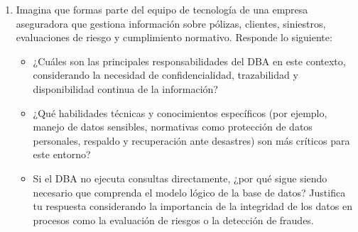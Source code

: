 \documentclass[12pt]{report}
\begin{document}
\begin{enumerate}[label=\textbf{\arabic*.}, leftmargin=*]
\begin{enumerate}[label=\textbf{\alph*.}, leftmargin=*, itemsep=1.0em]
 \hspace{0.3cm}\textbf{Ejemplo:} Pudiera ser el caso en donde tengamos a una misma persona registrada dos veces en la Base de Datos, puede que difieran en un campo/dato como el correo pero sigue siendo la misma persona y, por ende, guardando todos los demas datos dos veces (nombre, id, direccion, etc), lo que puede generar más costos no deseados en el almacenamiento si esta situacion sudece más veces.

 Ahora bien, la \textbf{redundancia No Controlada} puede generar inconsistencia y ser negativo para la integridad de los datos puesto que, como comentabamos antes en el ejemplo, puede tenerse más de una vez un mismo dato lo cual podría llevar a que al momento de querer modificarlo tiene que sincronizarse con los demas lugares en los que aparece pues si no se hace entonces perderiamos la consistencia en los datos y también perderiamos la integridad puesto que el dato puede llegar a tener distintos valores. Por esto mismo suele haber problemas cuando se trata de redundancia no controlada, pues viene consigo el degradamiento de rendimiento y aumente los costos con respecto al almacenamiento en la Base de Datos.


\item Imagina que formas parte del equipo de tecnolog\'ia de una empresa aseguradora que gestiona informaci\'on sobre p\'olizas, clientes, siniestros, evaluaciones de riesgo y cumplimiento normativo. Responde lo siguiente:
\begin{itemize}
  \item ¿Cu\'ales son las principales responsabilidades del DBA en este contexto, considerando la necesidad de confidencialidad, trazabilidad y disponibilidad continua de la informaci\'on?
  \item ¿Qu\'e habilidades t\'ecnicas y conocimientos espec\'ificos (por ejemplo, manejo de datos sensibles, normativas como protecci\'on de datos personales, respaldo y recuperaci\'on ante desastres) son m\'as cr\'iticos para este entorno?
  \item Si el DBA no ejecuta consultas directamente, ¿por qu\'e sigue siendo necesario que comprenda el modelo l\'ogico de la base de datos? Justifica tu respuesta considerando la importancia de la integridad de los datos en procesos como la evaluaci\'on de riesgos o la detecci\'on de fraudes.
\end{itemize}


\end{enumerate}
\end{enumerate}
\end{document}
